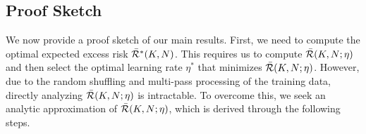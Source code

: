 



\vspace{-0.07in}
\subsection{Proof Sketch}\label{sec:strongly-convex-tech}

\vspace{-0.03in}
We now provide a proof sketch of our main results. 
First, we need to compute the optimal expected excess risk $\bar{\mathcal{R}}^*(K,N)$. This requires us to compute $\bar{\mathcal{R}}(K,N;\eta)$ and then select the optimal learning rate $\eta^*$ that minimizes $\bar{\mathcal{R}}(K,N;\eta)$. However, due to the random shuffling and multi-pass processing of the training data, directly analyzing $\bar{\mathcal{R}}(K,N;\eta)$ is intractable. To overcome this, we seek an analytic approximation of $\bar{\mathcal{R}}(K,N;\eta)$, which is derived through the following steps.

